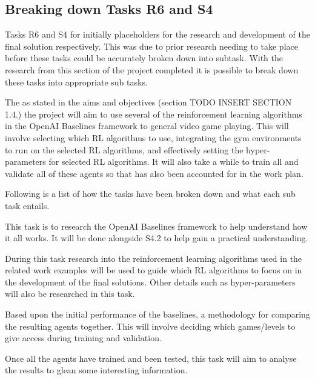 \documentclass[a4paper]{article}
\begin{document}
\subsection{Breaking down Tasks R6 and S4}
Tasks R6 and S4 for initially placeholders for the research and development of the final solution respectively.
This was due to prior research needing to take place before these tasks could be accurately broken down into subtask.
With the research from this section of the project completed it is possible to break down these tasks into appropriate sub tasks.
\par
The as stated in the aims and objectives (section TODO INSERT SECTION 1.4.) the project will aim to use several of the reinforcement learning algorithms in the OpenAI Baselines framework to general video game playing.
This will involve selecting which RL algorithms to use, integrating the gym environments to run on the selected RL algorithms, and effectively setting the hyper-parameters for selected RL algorithms.
It will also take a while to train all and validate all of these agents so that has also been accounted for in the work plan.
\par
Following is a list of how the tasks have been broken down and what each sub task entails.
\begin{description}
\setlength{\itemsep}{0pt}
\setlength{\parskip}{0pt}
\item [\large{Research}]
\item [R6.1--Baselines Basic Research]
This task is to research the OpenAI Baselines framework to help understand how it all works.
It will be done alongside S4.2 to help gain a practical understanding.
\item [R6.2--Research effective RL Algorithms]
During this task research into the reinforcement learning algorithms used in the related work examples will be used to guide which RL algorithms to focus on in the development of the final solutions.
Other details such as hyper-parameters will also be researched in this task.
\item [R6.3--Select Final Comparison Methodology]
Based upon the initial performance of the baselines, a methodology for comparing the resulting agents together.
This will involve deciding which games/levels to give access during training and validation.
\item [R6.4--Analyse the Results]
Once all the agents have trained and been tested, this task will aim to analyse the results to glean some interesting information.
\end{description}
\end{document}

